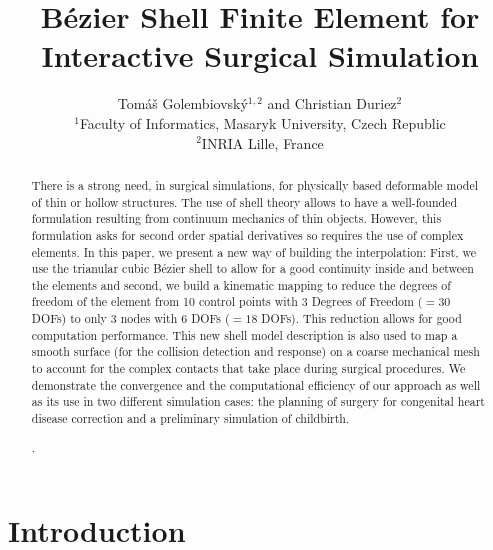 \documentclass{egpubl}
\title[B\'ezier Shell FE]%
      {B\'ezier Shell Finite Element for Interactive Surgical Simulation}
\author[T. Golembiovský \& C. Duriez]
       {Tomáš Golembiovský$^{1,2}$ and Christian Duriez$^{2}$\\
        $^1$Faculty of Informatics, Masaryk University, Czech Republic\\
        $^2$INRIA Lille, France
       } %
\begin{document}

\maketitle

\begin{abstract}
There is a strong need, in surgical simulations, for physically based deformable model of thin or hollow structures.
The use of shell theory allows to have a well-founded formulation resulting from continuum mechanics of thin objects.
However, this formulation asks for second order spatial derivatives so requires the use of complex elements.
In this paper, we present a new way of building the interpolation:
First, we use the trianular cubic B\'ezier shell to allow for a good continuity inside and between the elements and second, we build a kinematic mapping to reduce the degrees of freedom of the element from 10 control points with 3 Degrees of Freedom ($=30$ DOFs) to only 3 nodes with 6 DOFs ($=18$ DOFs).
This reduction allows for good computation performance.
This new shell model description is also used to map a smooth surface (for the collision detection and response) on a coarse mechanical mesh to account for the complex contacts that take place during surgical procedures.
We demonstrate the convergence and the computational efficiency of our approach as well as its use in two different simulation cases: the planning of surgery for congenital heart disease correction and a preliminary simulation of childbirth.

\begin{classification} %
    .
\end{classification}

\end{abstract}






\section{Introduction} %
\end{document}
